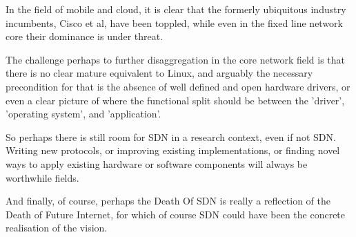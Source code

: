 In the field of mobile and cloud, it is clear that the formerly ubiquitous industry incumbents, Cisco et al, have been toppled, while even in the fixed line network core their dominance is under threat.

The challenge perhaps to further disaggregation in the core network field is that there is no clear mature equivalent to Linux, and arguably the necessary precondition for that is the absence of well defined and open hardware drivers, or even a clear picture of where the functional split should be between the 'driver', 'operating system', and 'application'.

So perhaps there is still room for SDN in a research context, even if not SDN.  Writing new protocols, or improving existing implementations, or finding novel ways to apply existing hardware or software components will always be worthwhile fields.

And finally, of course, perhaps the Death Of SDN is really a reflection of the Death of Future Internet, for which of course SDN could have been the concrete realisation of the vision.
